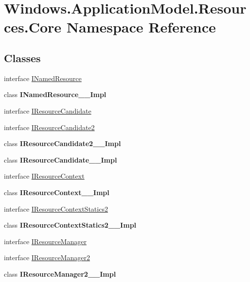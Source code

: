 \hypertarget{namespace_windows_1_1_application_model_1_1_resources_1_1_core}{}\section{Windows.\+Application\+Model.\+Resources.\+Core Namespace Reference}
\label{namespace_windows_1_1_application_model_1_1_resources_1_1_core}
\subsection*{Classes}
\begin{DoxyCompactItemize}
\item 
interface \hyperlink{interface_windows_1_1_application_model_1_1_resources_1_1_core_1_1_i_named_resource}{I\+Named\+Resource}
\item 
class {\bfseries I\+Named\+Resource\+\_\+\+\_\+\+Impl}
\item 
interface \hyperlink{interface_windows_1_1_application_model_1_1_resources_1_1_core_1_1_i_resource_candidate}{I\+Resource\+Candidate}
\item 
interface \hyperlink{interface_windows_1_1_application_model_1_1_resources_1_1_core_1_1_i_resource_candidate2}{I\+Resource\+Candidate2}
\item 
class {\bfseries I\+Resource\+Candidate2\+\_\+\+\_\+\+Impl}
\item 
class {\bfseries I\+Resource\+Candidate\+\_\+\+\_\+\+Impl}
\item 
interface \hyperlink{interface_windows_1_1_application_model_1_1_resources_1_1_core_1_1_i_resource_context}{I\+Resource\+Context}
\item 
class {\bfseries I\+Resource\+Context\+\_\+\+\_\+\+Impl}
\item 
interface \hyperlink{interface_windows_1_1_application_model_1_1_resources_1_1_core_1_1_i_resource_context_statics2}{I\+Resource\+Context\+Statics2}
\item 
class {\bfseries I\+Resource\+Context\+Statics2\+\_\+\+\_\+\+Impl}
\item 
interface \hyperlink{interface_windows_1_1_application_model_1_1_resources_1_1_core_1_1_i_resource_manager}{I\+Resource\+Manager}
\item 
interface \hyperlink{interface_windows_1_1_application_model_1_1_resources_1_1_core_1_1_i_resource_manager2}{I\+Resource\+Manager2}
\item 
class {\bfseries I\+Resource\+Manager2\+\_\+\+\_\+\+Impl}

\end{DoxyCompactItemize}
